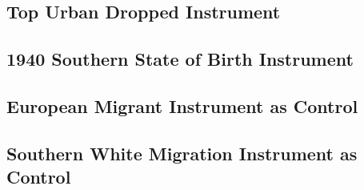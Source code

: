 \documentclass{article}
\begin{document}

\clearpage


\subsection{Top Urban Dropped Instrument}



\clearpage



\clearpage


\subsection{1940 Southern State of Birth Instrument}



\clearpage




\clearpage


\subsection{European Migrant Instrument as Control}



\clearpage




\clearpage


\subsection{Southern White Migration Instrument as Control}



\clearpage

\end{document}
